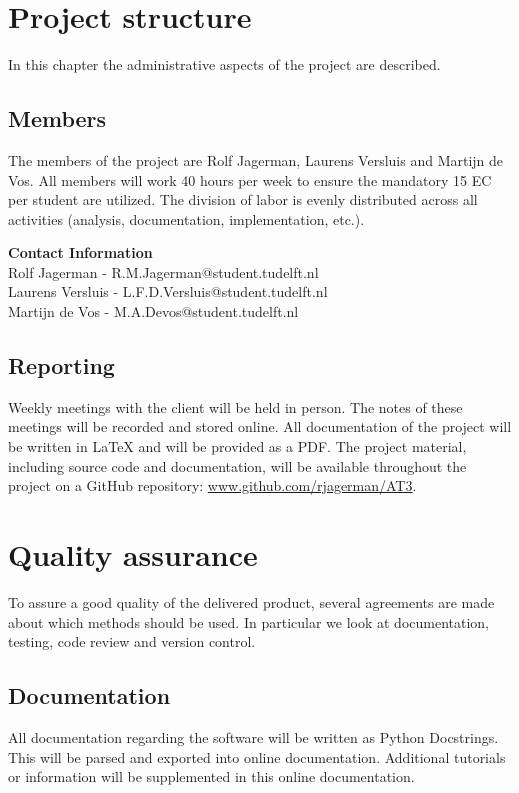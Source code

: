 \section{Project structure}

In this chapter the administrative aspects of the project are described.

\subsection{Members}
The members of the project are Rolf Jagerman, Laurens Versluis and Martijn de Vos. All members will work 40 hours per week to ensure the mandatory 15 EC per student are utilized. The division of labor is evenly distributed across all activities (analysis, documentation, implementation, etc.).

\noindent \textbf{Contact Information}\\
Rolf Jagerman - R.M.Jagerman@student.tudelft.nl\\
Laurens Versluis - L.F.D.Versluis@student.tudelft.nl\\
Martijn de Vos - M.A.Devos@student.tudelft.nl

\subsection{Reporting}
Weekly meetings with the client will be held in person. The notes of these meetings will be recorded and stored online. All documentation of the project will be written in {\LaTeX} and will be provided as a PDF. The project material, including source code and documentation, will be available throughout the project on a GitHub repository: \href{http://www.github.com/rjagerman/AT3/}{www.github.com/rjagerman/AT3}.

\section{Quality assurance}

To assure a good quality of the delivered product, several agreements are made about which methods should be used. In particular we look at documentation, testing, code review and version control.

\subsection{Documentation}
All documentation regarding the software will be written as Python Docstrings. This will be parsed and exported into online documentation. Additional tutorials or information will be supplemented in this online documentation.

